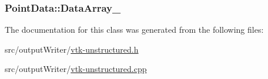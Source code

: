 \subsubsection[{\texorpdfstring{Data\+Array\+\_\+}{DataArray_}}]{ Point\+Data\+::\+Data\+Array\+\_\+\hspace{0.3cm}{\ttfamily [protected]}}\hypertarget{classPointData_ac8eb59ecb308a38ccd18bd6185e32a92}{}\label{classPointData_ac8eb59ecb308a38ccd18bd6185e32a92}


The documentation for this class was generated from the following files\+:\begin{DoxyCompactItemize}
\item 
src/output\+Writer/\hyperlink{vtk-unstructured_8h}{vtk-\/unstructured.\+h}\item 
src/output\+Writer/\hyperlink{vtk-unstructured_8cpp}{vtk-\/unstructured.\+cpp}\end{DoxyCompactItemize}
